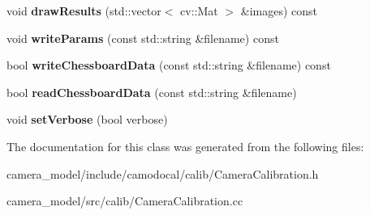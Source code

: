 \begin{DoxyCompactItemize}
void {\bfseries draw\+Results} (std\+::vector$<$ cv\+::\+Mat $>$ \&images) const
\item 
\mbox{\label{classcamodocal_1_1CameraCalibration_a65a11eafa17db001f81daa1440f25ae2}} 
void {\bfseries write\+Params} (const std\+::string \&filename) const
\item 
\mbox{\label{classcamodocal_1_1CameraCalibration_af4d5a4fb78fb44fa7486b97cce5a9ddb}} 
bool {\bfseries write\+Chessboard\+Data} (const std\+::string \&filename) const
\item 
\mbox{\label{classcamodocal_1_1CameraCalibration_a32e882640042a6684d0b772c4f27c977}} 
bool {\bfseries read\+Chessboard\+Data} (const std\+::string \&filename)
\item 
\mbox{\label{classcamodocal_1_1CameraCalibration_add7f51ba49bc48088568377259cc7201}} 
void {\bfseries set\+Verbose} (bool verbose)
\end{DoxyCompactItemize}


The documentation for this class was generated from the following files\+:\begin{DoxyCompactItemize}
\item 
camera\+\_\+model/include/camodocal/calib/Camera\+Calibration.\+h\item 
camera\+\_\+model/src/calib/Camera\+Calibration.\+cc\end{DoxyCompactItemize}
